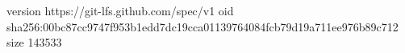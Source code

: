 version https://git-lfs.github.com/spec/v1
oid sha256:00bc87cc9747f953b1edd7dc19cca01139764084fcb79d19a711ee976b89c712
size 143533
